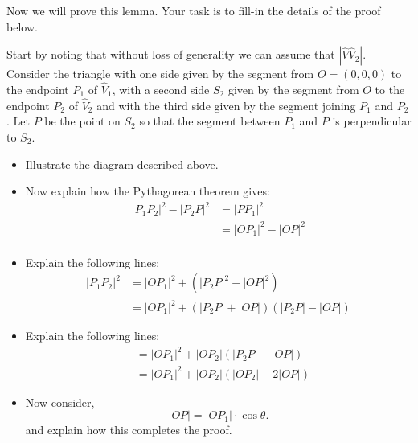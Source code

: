 \documentclass{ximera}
\begin{document}
Now we will prove this lemma. Your task is to fill-in the details of
the proof below.

\begin{problem}
Start by noting that without loss of generality we can assume that
$\left\vert \hat{V}%
\hat{V}_{2}\right\vert$. Consider the triangle with one side given by
the segment from $O=\left( 0,0,0\right) $ to the endpoint $P_{1}$ of
$\hat{V}_{1}$, with a second side $S_{2}$ given by the segment from
$O$ to the endpoint $P_{2}$ of $\hat{V}_{2}$ and with the third side
given by the segment joining $P_{1}$ and $P_{2}$. Let $P$ be the
point on $S_{2}$ so that the segment between $P_{1}$ and $P$ is
perpendicular to $S_{2}$.
\begin{itemize}
\item Illustrate the diagram described above. 
\item Now explain how the Pythagorean theorem gives:
\begin{align*}
|P_{1}P_{2}|^{2} - |P_{2}P|^{2} &= |PP_{1}|^{2}\\
&= |OP_{1}|^{2} - |OP|^{2}\\
\end{align*}
\item Explain the following lines:
\begin{align*}
|P_{1}P_{2}|^{2} &= |OP_{1}|^{2}+\left(|P_{2}P|^{2}-|OP|^{2}\right) \\
&=|OP_{1}|^{2}+\left(|P_{2}P|+|OP|\right)\left(|P_{2}P|-|OP| \right)
\end{align*}
\item Explain the following lines:
\begin{align*}
&=|OP_{1}|^{2}+|OP_{2}| \left(|P_{2}P|-|OP|\right)\\
&=|OP_{1}|^{2}+|OP_{2}| \left(|OP_{2}| -2| OP| \right)
\end{align*}
\item Now consider,
\[
|OP| =|OP_{1}| \cdot\cos\theta.
\]
and explain how this completes the proof.
\end{itemize}
\end{problem}



\end{document}
